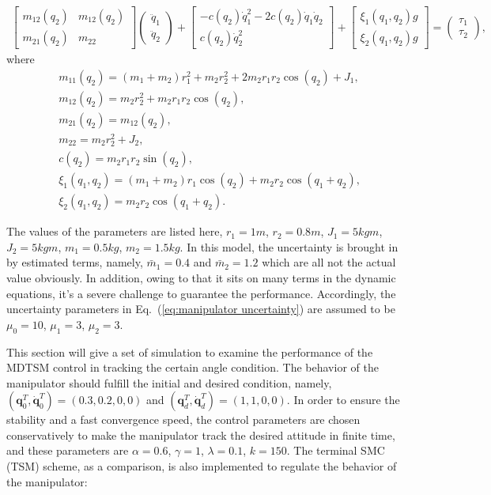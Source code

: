 \documentclass[3p]{elsarticle}
\theoremstyle{plain}
\theoremstyle{remark}
\begin{document}
\begin{align}
\begin{bmatrix}
m_{12}(q_2) &m_{12}(q_2)\\
m_{21}(q_2) &m_{22}
\end{bmatrix}
\begin{pmatrix}
\ddot q_1\\
\ddot q_2
\end{pmatrix}
+
\begin{bmatrix}
-c(q_2)\dot q_1^2-2c(q_2)\dot q_1\dot q_2\\
c(q_2)\dot q_2^2
\end{bmatrix}+
\begin{bmatrix}
\xi_1(q_1,q_2) g\\
\xi_2(q_1,q_2) g
\end{bmatrix}=
\begin{pmatrix}
\tau_1\\
\tau_2
\end{pmatrix},\label{eq:manipulator}
\end{align}
where
\begin{align*}
&m_{11}(q_2)=(m_1+m_2)r_1^2+m_2r_2^2+2m_2r_1r_2\cos(q_2)+J_1,\\
&m_{12}(q_2)=m_2r_2^2+m_2r_1r_2\cos(q_2),\\
&m_{21}(q_2)=m_{12}(q_2),\\
&m_{22}=m_2r_2^2+J_2,\\
&c(q_2)=m_2r_1r_2\sin(q_2),\\
&\xi_1(q_1,q_2) =(m_1+m_2)r_1\cos(q_2)+m_2r_2\cos(q_1+q_2),\\
&\xi_2(q_1,q_2) = m_2r_2\cos(q_1+q_2).
\end{align*}\par
The values of the parameters are listed here, $r_1=1m$, $r_2=0.8m$, $J_1=5 kgm$, $J_2=5kgm$, $m_1=0.5kg$, $m_2=1.5kg$. In this model, the uncertainty is brought in by estimated terms, namely, $\bar m_1=0.4$ and $\bar m_2=1.2$ which are all not the actual value obviously. In addition, owing to that it sits on many terms in the dynamic equations, it's a severe challenge to guarantee the performance. Accordingly, the uncertainty parameters in Eq.~(\ref{eq:manipulator uncertainty}) are assumed to be $\mu_0=10$, $\mu_1=3$, $\mu_2=3$.\par
This section will give a set of simulation to examine the performance of the MDTSM control in tracking the certain angle condition. The behavior of the manipulator should fulfill the initial and desired condition, namely, $(\bm q_0^T, \dot{\bm q}_0^T)= (0.3,0.2,0,0)$ and $({\bm q}_d^T,\dot{\bm q}_d^T)=(1,1,0,0)$. In order to ensure the stability and a fast convergence speed, the control parameters are chosen conservatively to make the manipulator track the desired attitude in finite time, and these parameters are $\alpha = 0.6$, $\gamma = 1$, $\lambda = 0.1$, $k = 150$. The terminal SMC (TSM) scheme, as a comparison, is also implemented to regulate the behavior of the manipulator:
\end{document}
